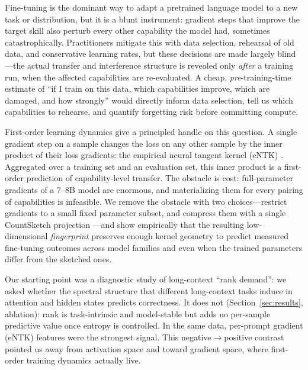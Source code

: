 \documentclass{article} %
\begin{document}
Fine-tuning is the dominant way to adapt a pretrained language model to a new task or
distribution, but it is a blunt instrument: gradient steps that improve the target skill also
perturb every other capability the model had, sometimes catastrophically. Practitioners
mitigate this with data selection, rehearsal of old data, and conservative learning rates, but
these decisions are made largely blind---the actual transfer and interference structure is
revealed only \emph{after} a training run, when the affected capabilities are re-evaluated.
A cheap, \emph{pre}-training-time estimate of ``if I train on this data, which capabilities
improve, which are damaged, and how strongly'' would directly inform data selection, tell us
which capabilities to rehearse, and quantify forgetting risk before committing compute.

First-order learning dynamics give a principled handle on this question. A single gradient step
on a sample changes the loss on any other sample by the inner product of their loss gradients:
the empirical neural tangent kernel (eNTK) \citep{jacot2018ntk,malladi2023kernel}. Aggregated
over a training set and an evaluation set, this inner product is a first-order prediction of
capability-level transfer. The obstacle is cost: full-parameter gradients of a 7--8B model are
enormous, and materializing them for every pairing of capabilities is infeasible. We remove the
obstacle with two choices---restrict gradients to a small fixed parameter subset, and compress
them with a single CountSketch projection \citep{charikar2002countsketch}---and show empirically
that the resulting low-dimensional \emph{fingerprint} preserves enough kernel geometry to
predict measured fine-tuning outcomes across model families and even when the trained parameters
differ from the sketched ones.

Our starting point was a diagnostic study of long-context ``rank demand'': we asked whether the
spectral structure that different long-context tasks induce in attention and hidden states
predicts correctness. It does not (Section~\ref{sec:results}, ablation): rank is task-intrinsic
and model-stable but adds no per-sample predictive value once entropy is controlled. In the same
data, per-prompt gradient (eNTK) features were the strongest signal. This negative$\rightarrow$positive
contrast pointed us away from activation space and toward gradient space, where first-order
training dynamics actually live.
\end{document}

